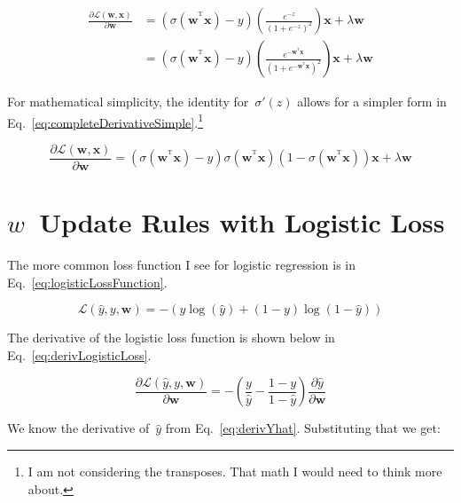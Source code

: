 \documentclass{report}
\newcommand{\yhat}{\hat{y}}
\newcommand{\T}{^\textrm{T}}
\begin{document}
  \begin{align}
    \frac{\partial \mathcal{L}(\mathbf{w}, \mathbf{x})}{\partial \mathbf{w}} &= \left( \sigma(\mathbf{w}^{\T} \mathbf{x}) - y \right) \left( \frac{e^{-z}}{(1+e^{-z})^{2}} \right) \mathbf{x} + \lambda \mathbf{w}\\
    &= \left( \sigma(\mathbf{w}^{\T} \mathbf{x}) - y \right) \left( \frac{e^{-\mathbf{w}^{\T} \mathbf{x}}}{(1+e^{-\mathbf{w}^{\T} \mathbf{x}})^{2}} \right) \mathbf{x} + \lambda \mathbf{w}
    \label{eq:completeDerivative}
  \end{align}  
  
  \noindent
  For mathematical simplicity, the identity for~$\sigma'(z)$ allows for a simpler form in Eq.~\eqref{eq:completeDerivativeSimple}.\footnote{I am not considering the transposes.  That math I would need to think more about.}
  
  \begin{equation}
    \frac{\partial \mathcal{L}(\mathbf{w}, \mathbf{x})}{\partial \mathbf{w}} = \left( \sigma(\mathbf{w}^{\T} \mathbf{x}) - y \right) \sigma(\mathbf{w}^{\T} \mathbf{x}) \left( 1 - \sigma(\mathbf{w}^{\T} \mathbf{x}) \right)  \mathbf{x} + \lambda \mathbf{w}
  \label{eq:completeDerivativeSimple}
  \end{equation} 
    
  \section{$w$~Update Rules with Logistic Loss}
  
  The more common loss function I see for logistic regression is in Eq.~\eqref{eq:logisticLossFunction}.
  
  \begin{equation}
    \mathcal{L}(\yhat,y,\mathbf{w}) = -\left(  y\log(\yhat) + (1-y) \log(1-\yhat) \right)
    \label{eq:logisticLossFunction}
  \end{equation}
  
  \noindent
  The derivative of the logistic loss function is shown below in Eq.~\eqref{eq:derivLogisticLoss}.
  
  \begin{equation}
    \frac{\partial \mathcal{L}(\yhat,y,\mathbf{w})}{\partial \mathbf{w}} = -\left(  \frac{y}{\yhat} - \frac{1-y}{1-\yhat} \right) \frac{\partial \yhat}{\partial \mathbf{w}}
    \label{eq:derivLogisticLoss}
  \end{equation}
  
  \noindent
  We know the derivative of~$\yhat$ from Eq.~\eqref{eq:derivYhat}.  Substituting that we get:
  
\end{document}
